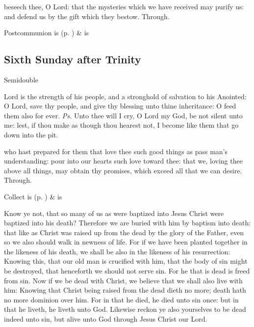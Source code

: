 \postcommunion
{} beseech thee, O Lord: that the mysteries which we have received may purify us: and defend us by the gift which they bestow. Through.


\begin{rubric}
     Postcommunion is  (p. \pageref{SPSaints}) \&  is 
\end{rubric}


\clearpage
\subsection{Sixth Sunday after Trinity}
\begin{inhead}
    {Semidouble}
\end{inhead}


\introit
{} Lord is the strength of his people, and a stronghold of salvation to his Anointed: O Lord, save thy people, and give thy blessing unto thine inheritance: O feed them also for ever. \textit{Ps.} Unto thee will I cry, O Lord my God, be not silent unto me: lest, if thou make as though thou hearest not, I become like them that go down into the pit.

\collect
{} who hast prepared for them that love thee such good things as pass man's understanding: pour into our hearts such love toward thee: that we, loving thee above all things, may obtain thy promises, which exceed all that we can desire. Through.
\begin{rubric}
     Collect is  (p. \pageref{SPSaints}) \&  is 
\end{rubric}

 Know ye not, that so many of us as were baptized into Jesus Christ were baptized into his death? Therefore we are buried with him by baptism into death: that like as Christ was raised up from the dead by the glory of the Father, even so we also should walk in newness of life. For if we have been planted together in the likeness of his death, we shall be also in the likeness of his resurrection: Knowing this, that our old man is crucified with him, that the body of sin might be destroyed, that henceforth we should not serve sin. For he that is dead is freed from sin. Now if we be dead with Christ, we believe that we shall also live with him: Knowing that Christ being raised from the dead dieth no more; death hath no more dominion over him. For in that he died, he died unto sin once: but in that he liveth, he liveth unto God. Likewise reckon ye also yourselves to be dead indeed unto sin, but alive unto God through Jesus Christ our Lord.

